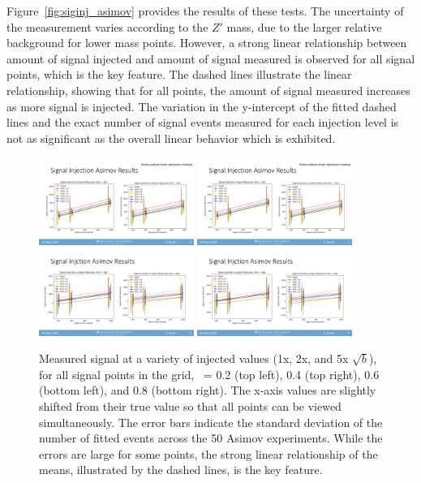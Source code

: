 Figure~\ref{fig:siginj_asimov} provides the results of these tests. 
The uncertainty of the measurement varies according to the $Z'$ mass, due to the larger relative background for lower mass points. 
However, a strong linear relationship between amount of signal injected and amount of signal measured is observed for all signal points, which is the key feature.
The dashed lines illustrate the linear relationship, showing that for all points, the amount of signal measured increases as more signal is injected.
The variation in the y-intercept of the fitted dashed lines and the exact number of signal events measured for each injection level is not as significant as the overall linear behavior which is exhibited.
\begin{figure}[!htbp]
\centering
   \includegraphics[width=0.45\textwidth]{figures/stats/siginj_asimov_02}
   \includegraphics[width=0.45\textwidth]{figures/stats/siginj_asimov_04}
   \includegraphics[width=0.45\textwidth]{figures/stats/siginj_asimov_06}
   \includegraphics[width=0.45\textwidth]{figures/stats/siginj_asimov_08}
   \caption{Measured signal at a variety of injected values (1x, 2x, and 5x $\sqrt{b}$), for all signal points in the grid, \rinv~= 0.2 (top left), 0.4 (top right), 0.6 (bottom left), and 0.8 (bottom right). The x-axis values are slightly shifted from their true value so that all points can be viewed simultaneously. The error bars indicate the standard deviation of the number of fitted events across the 50 Asimov experiments. While the errors are large for some points, the strong linear relationship of the means, illustrated by the dashed lines, is the key feature.
}
\end{figure}
